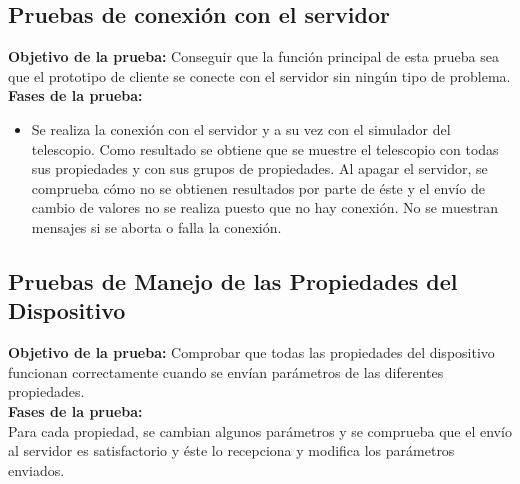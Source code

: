 \subsection{Pruebas de conexión con el servidor}
\textbf{Objetivo de la prueba:} Conseguir que la función principal de esta prueba sea que el prototipo de cliente se conecte con el servidor sin ningún tipo de problema.\\

\textbf{Fases de la prueba:}
\begin{itemize}
  \item Se realiza la conexión con el servidor y a su vez con el simulador del telescopio. Como resultado se obtiene que se muestre el telescopio con todas sus propiedades y con sus grupos de propiedades. Al apagar el servidor, se comprueba cómo no se obtienen resultados por parte de éste y el envío de cambio de valores no se realiza puesto que no hay conexión. No se muestran mensajes si se aborta o falla la conexión.
\end{itemize}

\subsection{Pruebas de Manejo de las Propiedades del Dispositivo}
\textbf{Objetivo de la prueba:} Comprobar que todas las propiedades del dispositivo funcionan correctamente cuando se envían parámetros de las diferentes propiedades.\\

\textbf{Fases de la prueba:}\\

Para cada propiedad, se cambian algunos parámetros y se comprueba que el envío al servidor es satisfactorio y éste lo recepciona y modifica los parámetros enviados.

